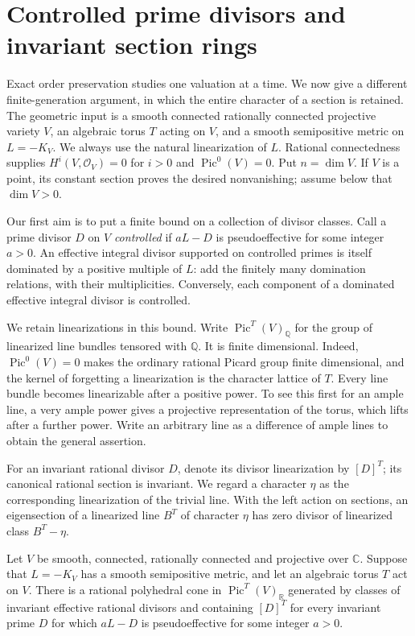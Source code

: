 \section{Controlled prime divisors and invariant section rings}
\label{V:controlled-cone-section}

Exact order preservation studies one valuation at a time.  We now give a
different finite-generation argument, in which the entire character of a
section is retained.  The geometric input is a smooth connected rationally
connected projective variety $V$, an algebraic torus $T$ acting on $V$, and
a smooth semipositive metric on $L=-K_V$.  We always use the natural
linearization of $L$.  Rational connectedness supplies
$H^i(V,\mathcal O_V)=0$ for $i>0$ and $\operatorname{Pic}^0(V)=0$.
Put $n=\dim V$.
If $V$ is a point, its constant section proves the desired nonvanishing;
assume below that $\dim V>0$.

Our first aim is to put a finite bound on a collection of divisor
classes.  Call a prime divisor $D$ on $V$ \emph{controlled} if
$aL-D$ is pseudoeffective for some integer $a>0$.  An effective integral
divisor supported on controlled primes is itself dominated by a positive
multiple of $L$: add the finitely many domination relations, with their
multiplicities.  Conversely, each component of a dominated effective
integral divisor is controlled.

We retain linearizations in this bound.  Write
$\operatorname{Pic}^T(V)_{\mathbb Q}$ for the group of linearized line
bundles tensored with $\mathbb Q$.  It is finite dimensional.  Indeed,
$\operatorname{Pic}^0(V)=0$ makes the ordinary rational Picard group
finite dimensional, and the kernel of forgetting a linearization is the
character lattice of $T$.  Every line bundle becomes linearizable after
a positive power.  To see this first for an ample line, a very ample
power gives a projective representation of the torus, which lifts after
a further power.  Write an arbitrary line as a difference of ample lines
to obtain the general assertion.

For an invariant rational divisor $D$, denote its divisor linearization
by $[D]^T$; its canonical rational section is invariant.  We regard a
character $\eta$ as the corresponding linearization of the trivial line.
With the left action on sections, an eigensection of a linearized line
$B^T$ of character $\eta$ has zero divisor of linearized class
$B^T-\eta$.

\begin{proposition}
\label{V:controlled-cone}
Let $V$ be smooth, connected, rationally connected and projective over
$\mathbb C$.  Suppose that $L=-K_V$ has a smooth semipositive metric,
and let an algebraic torus $T$ act on $V$.  There is a rational
polyhedral cone in $\operatorname{Pic}^T(V)_{\mathbb R}$ generated by
classes of invariant effective rational divisors and containing $[D]^T$
for every invariant prime $D$ for which $aL-D$ is pseudoeffective for
some integer $a>0$.
\end{proposition}

